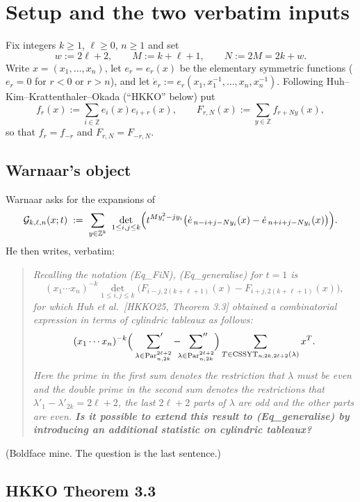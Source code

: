 \documentclass[11pt]{article}
\theoremstyle{definition}
\DeclareMathOperator{\Par}{Par}
\DeclareMathOperator{\CSSYT}{CSSYT}
\newcommand{\la}{\lambda}
\newcommand{\Z}{\mathbb{Z}}
\newcommand{\edot}{\dot{e}}
\begin{document}
\section{Setup and the two verbatim inputs}\label{sec:setup}

Fix integers $k\ge1$, $\ell\ge0$, $n\ge1$ and set
\[
  w:=2\ell+2,\qquad M:=k+\ell+1,\qquad N:=2M=2k+w .
\]
Write $x=(x_1,\dots,x_n)$, let $e_r=e_r(x)$ be the elementary symmetric
functions ($e_r=0$ for $r<0$ or $r>n$), and let
$\edot_r:=e_r(x_1,x_1^{-1},\dots,x_n,x_n^{-1})$.
Following Huh--Kim--Krattenthaler--Okada (``HKKO'' below) put
\[
  f_r(x):=\sum_{i\in\Z}e_i(x)e_{i+r}(x),\qquad
  F_{r,N}(x):=\sum_{y\in\Z}f_{r+Ny}(x),
\]
so that $f_r=f_{-r}$ and $F_{r,N}=F_{-r,N}$.

\subsection*{Warnaar's object}

Warnaar \cite[\S6, eq.~(Eq\_generalise)]{W} asks for the expansions of
\begin{equation}\label{eq:gen}
  \mathcal G_{k,\ell,n}(x;t)\;:=\;
  \sum_{y\in\Z^{k}}\ \det_{1\le i,j\le k}
  \Bigl(t^{M y_i^{2}-j y_i}\bigl(
     \edot_{\,n-i+j-N y_i}(x)-\edot_{\,n+i+j-N y_i}(x)\bigr)\Bigr).
\end{equation}
He then writes, verbatim:
\begin{quote}\itshape
Recalling the notation \textup{(Eq\_FiN)}, \textup{(Eq\_generalise)} for $t=1$ is
\[
(x_1\cdots x_n)^{-k}\det_{1\le i,j\le k}\bigl(F_{i-j,2(k+\ell+1)}(x)-F_{i+j,2(k+\ell+1)}(x)\bigr),
\]
for which Huh et al.\ \textup{[HKKO25, Theorem 3.3]} obtained a combinatorial
expression in terms of cylindric tableaux as follows:
\[
(x_1\cdots x_n)^{-k}\Bigl(\ \sideset{}{'}\sum_{\la\in\Par_{n,2k}^{2\ell+2}}
-\sideset{}{''}\sum_{\la\in\Par_{n,2k}^{2\ell+2}}\Bigr)
\sum_{T\in\CSSYT_{n;2k,2\ell+2}(\la)}x^{T}.
\]
Here the prime in the first sum denotes the restriction that $\la$ must be even
and the double prime in the second sum denotes the restrictions that
$\la'_1-\la'_{2k}=2\ell+2$, the last $2\ell+2$ parts of $\la$ are odd and the
other parts are even.
\textbf{Is it possible to extend this result to \textup{(Eq\_generalise)} by
introducing an additional statistic on cylindric tableaux?}
\end{quote}
(Boldface mine. The question is the last sentence.)

\subsection*{HKKO Theorem 3.3}
\end{document}
